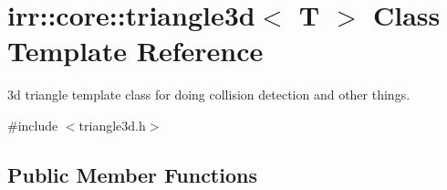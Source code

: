 \hypertarget{classirr_1_1core_1_1triangle3d}{}\section{irr\+:\+:core\+:\+:triangle3d$<$ T $>$ Class Template Reference}
\label{classirr_1_1core_1_1triangle3d}


3d triangle template class for doing collision detection and other things.  




{\ttfamily \#include $<$triangle3d.\+h$>$}

\subsection*{Public Member Functions}
